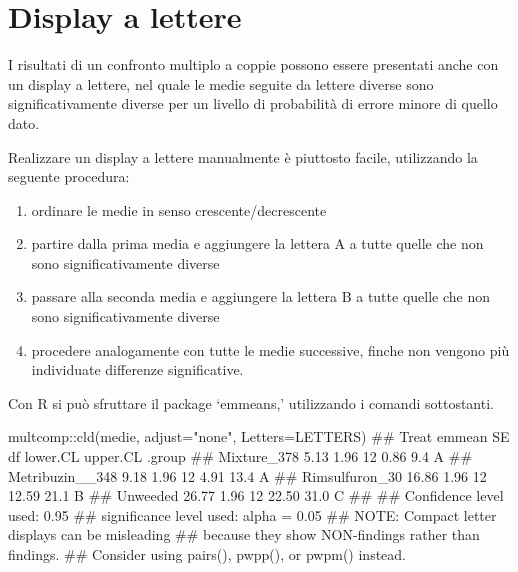 \documentclass[a4paper,12pt,oneside]{book}
\providecommand{\tightlist}{%
  \setlength{\itemsep}{0pt}\setlength{\parskip}{0pt}}
\newenvironment{Shaded}{\begin{snugshade}}{\end{snugshade}}
\newcommand{\SpecialCharTok}[1]{#1}
\newcommand{\StringTok}[1]{#1}
\newcommand{\DocumentationTok}[1]{#1}
\newcommand{\FunctionTok}[1]{#1}
\newcommand{\AttributeTok}[1]{#1}
\newcommand{\AlertTok}[1]{#1}
\newcommand{\NormalTok}[1]{#1}
\begin{document}
\normalsize

\hypertarget{display-a-lettere}{%
\section{Display a lettere}\label{display-a-lettere}}

I risultati di un confronto multiplo a coppie possono essere presentati anche con un display a lettere, nel quale le medie seguite da lettere diverse sono significativamente diverse per un livello di probabilità di errore minore di quello dato.

Realizzare un display a lettere manualmente è piuttosto facile, utilizzando la seguente procedura:

\begin{enumerate}
\def\labelenumi{\arabic{enumi}.}
\tightlist
\item
  ordinare le medie in senso crescente/decrescente
\item
  partire dalla prima media e aggiungere la lettera A a tutte quelle che non sono significativamente diverse
\item
  passare alla seconda media e aggiungere la lettera B a tutte quelle che non sono significativamente diverse
\item
  procedere analogamente con tutte le medie successive, finche non vengono più individuate differenze significative.
\end{enumerate}

Con R si può sfruttare il package `emmeans,' utilizzando i comandi sottostanti.

\begin{Shaded}
\begin{Highlighting}[]
\NormalTok{multcomp}\SpecialCharTok{::}\FunctionTok{cld}\NormalTok{(medie, }\AttributeTok{adjust=}\StringTok{"none"}\NormalTok{, }\AttributeTok{Letters=}\NormalTok{LETTERS)}
\DocumentationTok{\#\#  Treat           emmean   SE df lower.CL upper.CL .group}
\DocumentationTok{\#\#  Mixture\_378       5.13 1.96 12     0.86      9.4  A    }
\DocumentationTok{\#\#  Metribuzin\_\_348   9.18 1.96 12     4.91     13.4  A    }
\DocumentationTok{\#\#  Rimsulfuron\_30   16.86 1.96 12    12.59     21.1   B   }
\DocumentationTok{\#\#  Unweeded         26.77 1.96 12    22.50     31.0    C  }
\DocumentationTok{\#\# }
\DocumentationTok{\#\# Confidence level used: 0.95 }
\DocumentationTok{\#\# significance level used: alpha = 0.05 }
\DocumentationTok{\#\# }\AlertTok{NOTE}\DocumentationTok{: Compact letter displays can be misleading}
\DocumentationTok{\#\#       because they show NON{-}findings rather than findings.}
\DocumentationTok{\#\#       Consider using \textquotesingle{}pairs()\textquotesingle{}, \textquotesingle{}pwpp()\textquotesingle{}, or \textquotesingle{}pwpm()\textquotesingle{} instead.}
\end{Highlighting}
\end{Shaded}
\end{document}
